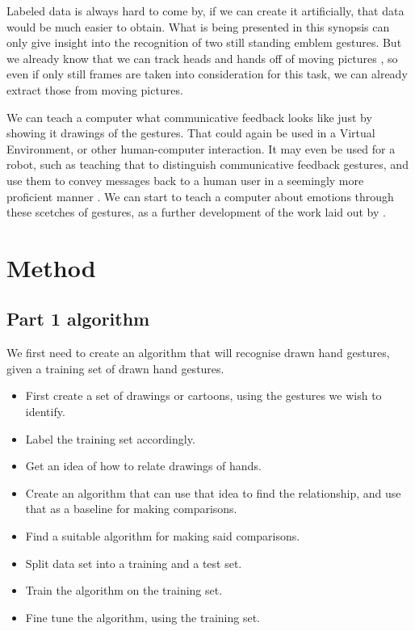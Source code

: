 \documentclass[11pt,a4paper]{article}
\begin{document}
Labeled data is always hard to come by, if we can create it artificially, that data would be much easier to obtain. What is being presented in this synopsis can only give insight into the recognition of two still standing emblem gestures. But we already know that we can track heads and hands off of moving pictures \cite{rehm}, so even if only still frames are taken into consideration for this task, we can already extract those from moving pictures.

We can teach a computer what communicative feedback looks like just by showing it drawings of the gestures. That could again be used in a Virtual Environment, or other human-computer interaction. It may even be used for a robot, such as teaching that to distinguish communicative feedback gestures, and use them to convey messages back to a human user in a seemingly more proficient manner \cite{allwood}. We can start to teach a computer about emotions through these scetches of gestures, as a further development of the work laid out by \cite{kipp}.

\section{Method}
\label{sec:method}

\subsection{Part 1 algorithm}
\label{sec:part-1-algorithm}

We first need to create an algorithm that will recognise drawn hand gestures, given a training set of drawn hand gestures.

\begin{itemize}
\item First create a set of drawings or cartoons, using the gestures we wish to identify.
\item Label the training set accordingly.
\item Get an idea of how to relate drawings of hands.
\item Create an algorithm that can use that idea to find the relationship, and use that as a baseline for making comparisons.
\item Find a suitable algorithm for making said comparisons.
\item Split data set into a training and a test set.
\item Train the algorithm on the training set.
\item Fine tune the algorithm, using the training set.
\end{itemize}
\end{document}
